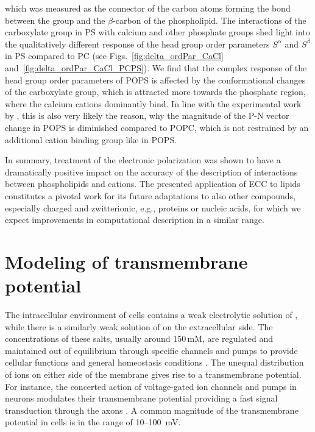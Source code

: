 \documentclass[12pt,a4paper,twoside,openright]{report}
\begin{document}
which was measured as the connector of the carbon atoms 
forming the bond between the group and the $\beta$-carbon of the phospholipid. 
The interactions of the carboxylate group in PS with calcium and other phosphate groups
shed light into the qualitatively different response of the head group order parameters $S^\alpha$ and $S^\beta$ in PS compared to PC 
(see Figs.~\ref{fig:delta_ordPar_CaCl} and~\ref{fig:delta_ordPar_CaCl_PCPS}). 
We find that the complex response of the head group order parameters of POPS 
is affected by the conformational changes of the carboxylate group,
which is attracted more towards the phosphate region, 
where the calcium cations dominantly bind. 
In line with the experimental work by \citet{browning80},
this is also very likely the reason, 
why the magnitude of the P-N vector change in POPS is diminished compared to POPC, 
which is not restrained by an additional cation binding group like  in POPS. 


In summary,
treatment  of the electronic polarization 
was shown to have a dramatically positive impact on the accuracy of the description of interactions
between phospholipids and cations. 
The presented application of ECC to lipids
constitutes a pivotal work for its future adaptations 
to also other compounds, especially charged and zwitterionic, 
e.g., proteins or nucleic acids,
for which we expect improvements in computational description in a similar range. 









\section*{Modeling of transmembrane potential}

The intracellular environment of cells contains a weak electrolytic solution of , 
while there is a similarly weak solution of  on the extracellular side. 
The concentrations of these salts, usually around 150\,mM, 
are regulated and maintained out of equilibrium through specific channels and pumps 
to provide cellular functions and general homeostasis conditions \citep{Bezanilla2008, Knudsen_book2002}. 
The unequal distribution of ions on either side of the membrane
gives rise to a transmembrane potential. 
For instance, the concerted action of voltage-gated ion channels and pumps in neurons 
modulates their transmembrane potential
providing a fast signal transduction through the axons \citep{Knudsen_book2002, Storace2015, Sung2015}. 
A common magnitude of the transmembrane potential in cells is in the range of 10--100~mV. 
\end{document}
